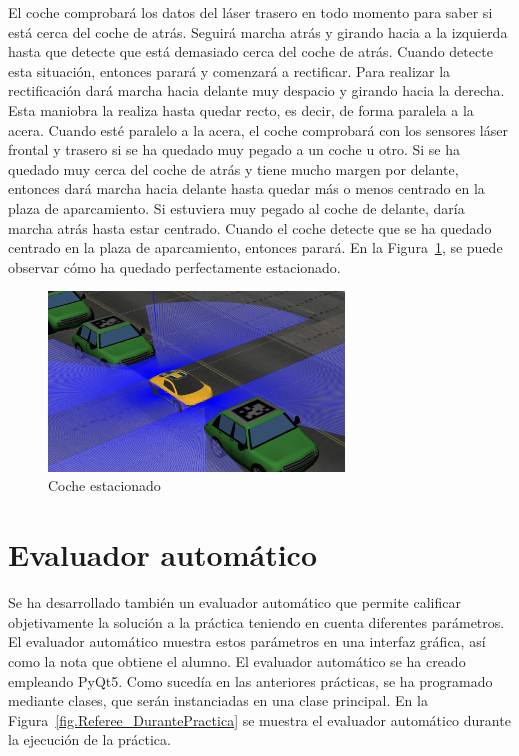El coche comprobará los datos del láser trasero en todo momento para saber si está cerca del coche de atrás. Seguirá marcha atrás y girando hacia a la izquierda hasta que detecte que está demasiado cerca del coche de atrás. Cuando detecte esta situación, entonces parará y comenzará a rectificar. Para realizar la rectificación dará marcha hacia delante muy despacio y girando hacia la derecha. Esta maniobra la realiza hasta quedar recto, es decir, de forma paralela a la acera. Cuando esté paralelo a la acera, el coche comprobará con los sensores láser frontal y trasero si se ha quedado muy pegado a un coche u otro. Si se ha quedado muy cerca del coche de atrás y tiene mucho margen por delante, entonces dará marcha hacia delante hasta quedar más o menos centrado en la plaza de aparcamiento. Si estuviera muy pegado al coche de delante, daría marcha atrás hasta estar centrado. Cuando el coche detecte que se ha quedado centrado en la plaza de aparcamiento, entonces parará. En la Figura~\ref{fig.Posicion5}, se puede observar cómo ha quedado perfectamente estacionado.

\begin{figure}[H]
  \begin{center}
    \includegraphics[width=0.7\textwidth]{figures/Autopark/Posicion5.png}
		\caption{Coche estacionado}
		\label{fig.Posicion5}
		\end{center}
\end{figure}


\section{Evaluador automático}
Se ha desarrollado también un evaluador automático que permite calificar objetivamente la solución a la práctica teniendo en cuenta diferentes parámetros. El evaluador automático muestra estos parámetros en una interfaz gráfica, así como la nota que obtiene el alumno. El evaluador automático se ha creado empleando PyQt5. Como sucedía en las anteriores prácticas, se ha programado mediante clases, que serán instanciadas en una clase principal. En la Figura~\ref{fig.Referee_DurantePractica} se muestra el evaluador automático durante la ejecución de la práctica.

